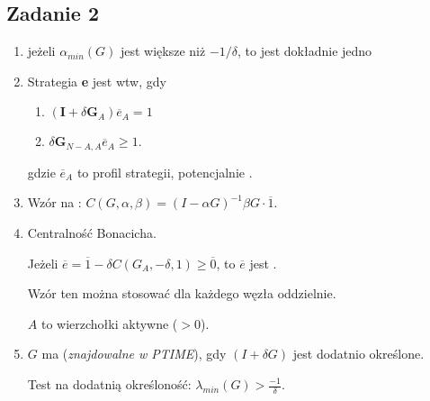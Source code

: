 \subsection{Zadanie 2}
\begin{enumerate}
  \item
    jeżeli $\alpha_{min}(G)$ jest większe niż $-1/\delta$, to jest dokładnie jedno
  \item Strategia \textbf{e} jest  wtw, gdy
    \begin{enumerate}
      \item $ (\textbf{I} + \delta \textbf{G}_{A})\overline{e}_{A} = 1$
      \item $ \delta\textbf{G}_{N-A,A}\overline{e}_A \geq 1.$
    \end{enumerate}

    gdzie $\overline{e}_A$ to profil strategii, potencjalnie .

  \item
    Wzór na :
    $C(G, \alpha, \beta) = (I - \alpha G)^{-1} \beta G \cdot \overline{1}$.

  \item
    Centralność Bonacicha.

    Jeżeli $\overline{e} = \overline{1} - \delta C(G_A, -\delta, 1) \geq \overline{0}$,
    to $\overline{e}$  jest .

    Wzór ten można stosować dla każdego węzła oddzielnie.

    $A$ to wierzchołki aktywne ($>0$).

  \item
    $G$ ma  (\textit{znajdowalne w PTIME}), gdy
    $(I+\delta G)$ jest dodatnio określone.

    Test na dodatnią określoność: $\lambda_{min}(G) > \frac{-1}{\delta}$.
\end{enumerate}

